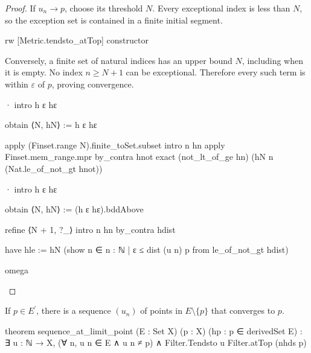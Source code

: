 \begin{proof}
  If $u_n\to p$, choose its threshold $N$.
  Every exceptional index is less than $N$, so the exception set is contained in a finite initial
  segment.

  \begin{lean}
    rw [Metric.tendsto_atTop]
    constructor
  \end{lean}

  Conversely, a finite set of natural indices has an upper bound $N$, including when it is empty.
  No index $n\geq N+1$ can be exceptional.
  Therefore every such term is within $\varepsilon$ of $p$, proving convergence.

  \begin{lean}
    · intro h ε hε

      obtain ⟨N, hN⟩ := h ε hε

      apply (Finset.range N).finite_toSet.subset
      intro n hn
      apply Finset.mem_range.mpr
      by_contra hnot
      exact (not_lt_of_ge hn) (hN n (Nat.le_of_not_gt hnot))

    · intro h ε hε

      obtain ⟨N, hN⟩ := (h ε hε).bddAbove

      refine ⟨N + 1, ?_⟩
      intro n hn
      by_contra hdist

      have hle := hN (show n ∈ {n : ℕ | ε ≤ dist (u n) p} from le_of_not_gt hdist)

      omega
  \end{lean}

\end{proof}

\begin{lemma}
  \label{an1:lem:sequence-at-limit-point}
  If $p\in E^{\prime}$, there is a sequence $(u_n)$ of points in $E\setminus\{p\}$ that converges
  to $p$.

  \begin{lean}
    theorem sequence_at_limit_point (E : Set X) (p : X) (hp : p ∈ derivedSet E) :
        ∃ u : ℕ → X, (∀ n, u n ∈ E ∧ u n ≠ p) ∧ Filter.Tendsto u Filter.atTop (nhds p)
  \end{lean}
\end{lemma}

